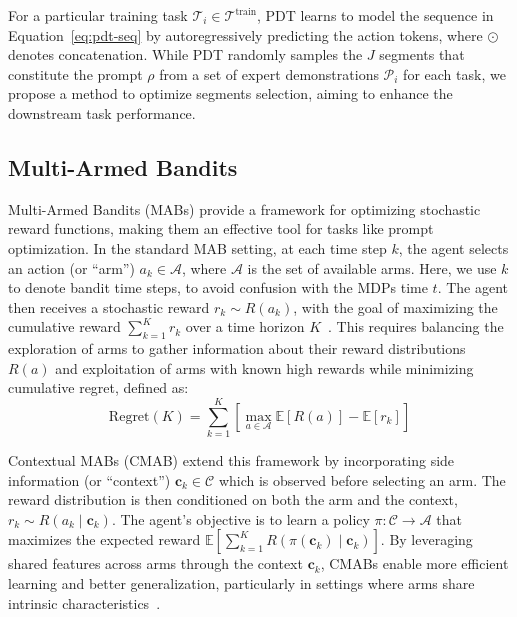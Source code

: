 \documentclass{article} %
\begin{document}
For a particular training task $\mathcal{T}_i \in \mathcal{T}^\text{train}$, PDT learns to model the sequence in Equation~\ref{eq:pdt-seq} by autoregressively predicting the action tokens, where $\odot$ denotes concatenation. 
While PDT randomly samples the $J$ segments that constitute the prompt $\rho$ from a set of expert demonstrations $\mathcal{P}_i$ for each task, we propose a method to optimize segments selection, aiming to enhance the downstream task performance.


\subsection{Multi-Armed Bandits}
Multi-Armed Bandits (MABs) provide a framework for optimizing stochastic reward functions, making them an effective tool for tasks like prompt optimization. 
In the standard MAB setting, at each time step $k$, the agent selects an action (or ``arm'') $a_k \in \mathcal{A}$, where $\mathcal{A}$ is the set of available arms. 
Here, we use $k$ to denote bandit time steps, to avoid confusion with the MDPs time $t$.
The agent then receives a stochastic reward $r_k \sim R(a_k)$, with the goal of maximizing the cumulative reward $\sum_{k=1}^K r_k$ over a time horizon $K$~\citep{auer2002finite}. This requires balancing the exploration of arms to gather information about their reward distributions $R(a)$ and exploitation of arms with known high rewards while minimizing cumulative regret, defined as:
\begin{equation}
    \text{Regret}(K) = \sum_{k=1}^K \left[ \max_{a \in \mathcal{A}} \mathbb{E}[R(a)] - \mathbb{E}[r_k] \right]
\end{equation}

Contextual MABs (CMAB) extend this framework by incorporating side information (or ``context'') $\mathbf{c}_k \in \mathcal{C}$ which is observed before selecting an arm. The reward distribution is then conditioned on both the arm and the context, $r_k \sim R(a_k \mid \mathbf{c}_k)$. The agent's objective is to learn a policy $\pi: \mathcal{C} \to \mathcal{A}$ that maximizes the expected reward $\mathbb{E}\left[\sum_{k=1}^K R(\pi(\mathbf{c}_k) \mid \mathbf{c}_k)\right]$. By leveraging shared features across arms through the context $\mathbf{c}_k$, CMABs enable more efficient learning and better generalization, particularly in settings where arms share intrinsic characteristics~\citep{li2010contextual}.
\end{document}
